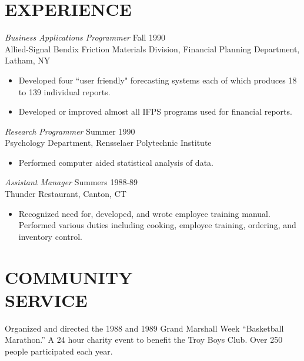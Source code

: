 \documentclass[margin]{style/res}
\begin{document}
\begin{resume}
\section{EXPERIENCE} {\sl Business Applications Programmer} \hfill Fall 1990 \\
                Allied-Signal Bendix Friction Materials Division,
                Financial Planning Department, Latham, NY
                 \begin{itemize}  \itemsep -2pt %
                 \item Developed four ``user friendly" forecasting
                    systems each of which produces 18 to 139
                    individual reports.
                \item   Developed or improved almost all IFPS
                    programs used for financial reports.
                \end{itemize}

                {\sl Research Programmer} \hfill            Summer 1990 \\
                Psychology Department, Rensselaer Polytechnic
                Institute
                 \begin{itemize}  \itemsep -2pt %
                 \item Performed computer aided statistical analysis
                    of data.
                 \end{itemize}
                {\sl Assistant Manager} \hfill        Summers 1988-89 \\
                Thunder Restaurant, Canton, CT
                  \begin{itemize}
                   \item Recognized need for, developed, and wrote
                    employee training manual. Performed various
                    duties including cooking, employee training,
                    ordering, and inventory control.
                   \end{itemize}

\section{COMMUNITY \\ SERVICE}  Organized and directed the 1988 and 1989 Grand
                 Marshall Week \newline ``Basketball Marathon.'' A 24 hour
                charity event to benefit the Troy Boys Club. Over
                250 people participated each year.


\end{resume}
\end{document}

